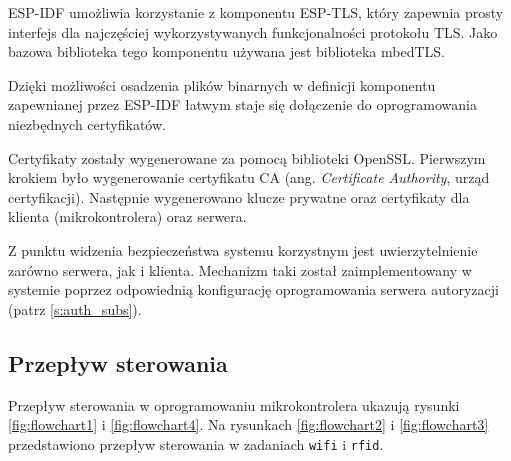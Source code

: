             ESP-IDF umożliwia korzystanie z komponentu ESP-TLS, który zapewnia prosty interfejs dla najczęściej wykorzystywanych funkcjonalności protokołu TLS. Jako bazowa biblioteka tego komponentu używana jest biblioteka mbedTLS.

            Dzięki możliwości osadzenia plików binarnych w definicji komponentu zapewnianej przez ESP-IDF łatwym staje się dołączenie do oprogramowania niezbędnych certyfikatów.

            Certyfikaty zostały wygenerowane za pomocą biblioteki OpenSSL. Pierwszym krokiem było wygenerowanie certyfikatu CA (ang. \textit{Certificate Authority}, urząd certyfikacji). Następnie wygenerowano klucze prywatne oraz certyfikaty dla klienta (mikrokontrolera) oraz serwera.

            Z punktu widzenia bezpieczeństwa systemu korzystnym jest uwierzytelnienie zarówno serwera, jak i klienta. Mechanizm taki został zaimplementowany w systemie poprzez odpowiednią konfigurację oprogramowania serwera autoryzacji (patrz \ref{s:auth_subs}).

        \subsection{Przepływ sterowania}

            Przepływ sterowania w oprogramowaniu mikrokontrolera ukazują rysunki \ref{fig:flowchart1} i \ref{fig:flowchart4}. Na rysunkach \ref{fig:flowchart2} i \ref{fig:flowchart3} przedstawiono przepływ sterowania w zadaniach \texttt{wifi} i \texttt{rfid}.


